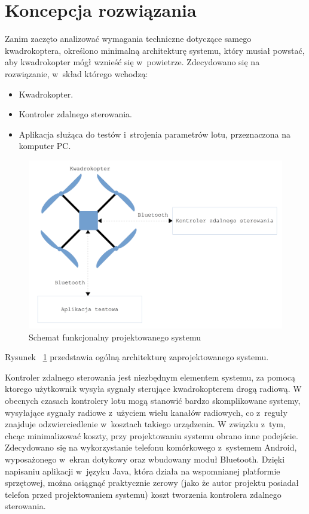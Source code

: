 \section{Koncepcja rozwiązania}

Zanim zaczęto analizować wymagania techniczne dotyczące samego kwadrokoptera, określono minimalną architekturę systemu, który musiał powstać, aby kwadrokopter mógł wznieść się w~powietrze. Zdecydowano się na rozwiązanie, w~skład którego wchodzą:

\begin{itemize}
	\item Kwadrokopter.
	\item Kontroler zdalnego sterowania.
	\item Aplikacja służąca do testów i~strojenia parametrów lotu, przeznaczona na komputer PC.
\end{itemize}

\begin{figure}[H]
	\centering
	\includegraphics[scale=0.1]{Pictures/SchematSystemu.png}
	\caption[Schemat blokowy systemu]{Schemat funkcjonalny projektowanego systemu}
	\label{fig:SchematSystemu}
\end{figure}



Rysunek ~\ref{fig:SchematSystemu} przedstawia ogólną architekturę zaprojektowanego systemu.

Kontroler zdalnego sterowania jest niezbędnym elementem systemu, za pomocą ktorego użytkownik wysyła sygnały sterujące kwadrokopterem drogą radiową. W obecnych czasach kontrolery lotu mogą stanowić bardzo skomplikowane systemy, wysyłające sygnały radiowe z~użyciem wielu kanałów radiowych, co z~reguły znajduje odzwierciedlenie w~kosztach takiego urządzenia. W związku z~tym, chcąc minimalizować koszty, przy projektowaniu systemu obrano inne podejście. Zdecydowano się na wykorzystanie telefonu komórkowego z~systemem Android, wyposażonego w~ekran dotykowy oraz wbudowany moduł Bluetooth. Dzięki napisaniu aplikacji w~języku Java, która działa na wspomnianej platformie sprzętowej, można osiągnąć praktycznie zerowy (jako że autor projektu posiadał telefon przed projektowaniem systemu) koszt tworzenia kontrolera zdalnego sterowania. 

